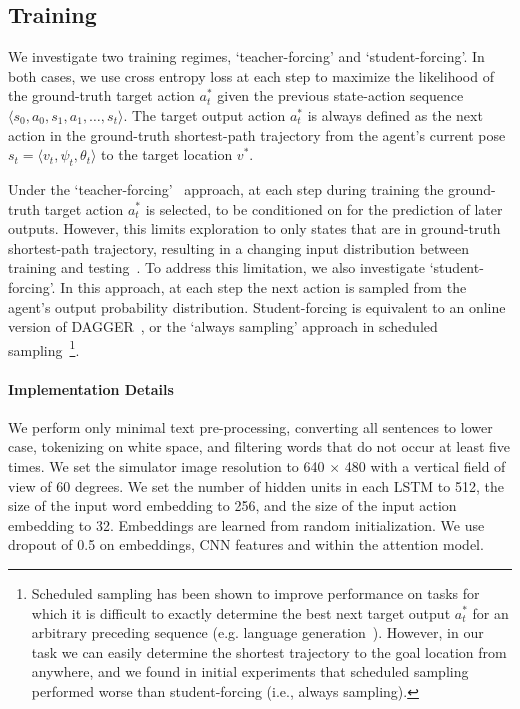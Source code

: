 \documentclass[10pt,twocolumn,letterpaper]{article}
\begin{document}
\subsection{Training}



We investigate two training regimes, `teacher-forcing' and `student-forcing'. In both cases, we use cross entropy loss at each step to maximize the likelihood of the ground-truth target action $a_t^*$ given the previous state-action sequence $\langle s_0,a_0,s_1,a_1, \dots, s_t \rangle $. The target output action $a_t^*$ is always defined as the next action in the ground-truth shortest-path trajectory from the agent's current pose $s_t = \langle v_t, \psi_t, \theta_t \rangle$ to the target location $v^*$.

Under the `teacher-forcing'~\cite{lamb2016professor} approach, at each step during training the ground-truth target action $a_t^*$ is selected, to be conditioned on for the prediction of later outputs. However, this limits exploration to only states that are in ground-truth shortest-path trajectory, resulting in a changing input distribution between training and testing~\cite{ross2011reduction,lamb2016professor}. To address this limitation, we also investigate `student-forcing'. In this approach, at each step the next action is sampled from the agent's output probability distribution. Student-forcing is equivalent to an online version of DAGGER~\cite{ross2011reduction}, or the `always sampling' approach in scheduled sampling~\cite{bengio2015scheduled}\footnote{Scheduled sampling has been shown to improve performance on tasks for which it is difficult to exactly determine the best next target output $a_t^*$ for an arbitrary preceding sequence (e.g. language generation~\cite{bengio2015scheduled}). However, in our task we can easily determine the shortest trajectory to the goal location from anywhere, and we found in initial experiments that scheduled sampling performed worse than student-forcing (i.e., always sampling).}.


\vspace{-0.3cm}
\paragraph{Implementation Details}

We perform only minimal text pre-processing, converting all sentences to lower case, tokenizing on white space, and filtering words that do not occur at least five times. We set the simulator image resolution to 640 $\times$ 480 with a vertical field of view of 60 degrees. We set the number of hidden units in each LSTM to 512, the size of the input word embedding to 256, and the size of the input action embedding to 32. Embeddings are learned from random initialization. We use dropout of 0.5 on embeddings, CNN features and within the attention model.
\end{document}
